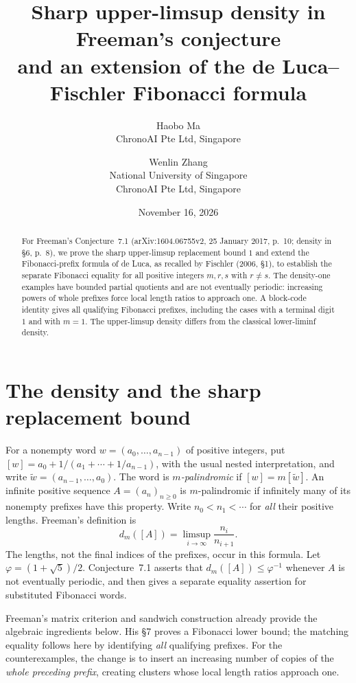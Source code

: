 \documentclass[11pt]{article}
\title{Sharp upper-limsup density in Freeman's conjecture\\
and an extension of the de Luca--Fischler Fibonacci formula}
\author{Haobo Ma\\\small ChronoAI Pte Ltd, Singapore
\and Wenlin Zhang\\\small National University of Singapore\\\small ChronoAI Pte Ltd, Singapore}
\date{November 16, 2026}
\begin{document}
\maketitle
\begin{abstract}
For Freeman's Conjecture~7.1 (arXiv:1604.06755v2, 25 January 2017,
p.~10; density in \S6, p.~8), we prove the sharp upper-limsup replacement
bound $1$ and extend the Fibonacci-prefix formula of de Luca, as recalled
by Fischler (2006, \S1), to
establish the separate Fibonacci equality for all positive integers $m,r,s$
with $r\ne s$.
The density-one examples have bounded partial quotients and are not
eventually periodic: increasing powers of whole prefixes force local length
ratios to approach one. A block-code identity gives all qualifying Fibonacci
prefixes, including the cases with a terminal digit $1$ and with $m=1$.
The upper-limsup density differs from the classical lower-liminf density.
\end{abstract}

\section{The density and the sharp replacement bound}
For a nonempty word $w=(a_0,\ldots,a_{n-1})$ of positive integers, put
$[w]=a_0+1/(a_1+\cdots+1/a_{n-1})$, with the usual nested interpretation,
and write $\widetilde w=(a_{n-1},\ldots,a_0)$. The word is
\emph{$m$-palindromic} if $[w]=m[\widetilde w]$.
An infinite positive sequence $A=(a_n)_{n\geq0}$ is $m$-palindromic if
infinitely many of its nonempty prefixes have this property. Write
$n_0<n_1<\cdots$ for \emph{all} their positive lengths. Freeman's definition
\cite[\S6, p.~8]{Freeman} is
\begin{equation}\label{eq:density}
 d_m([A])=\limsup_{i\to\infty}\frac{n_i}{n_{i+1}}.
\end{equation}
The lengths, not the final indices of the prefixes, occur in this formula.
Let $\varphi=(1+\sqrt5)/2$. Conjecture~7.1 asserts that
$d_m([A])\leq\varphi^{-1}$ whenever $A$ is not eventually periodic, and
then gives a separate equality assertion for substituted Fibonacci words.

Freeman's matrix criterion and sandwich construction
\cite[Lemmas~3.1--3.2, 3.6 and 3.9]{Freeman} already provide the
algebraic ingredients below. His \S7 proves a Fibonacci lower bound; the
matching equality follows here by identifying \emph{all} qualifying prefixes.
For the counterexamples, the change is to insert an increasing number of
copies of the \emph{whole preceding prefix}, creating clusters whose local
length ratios approach one.
\end{document}
